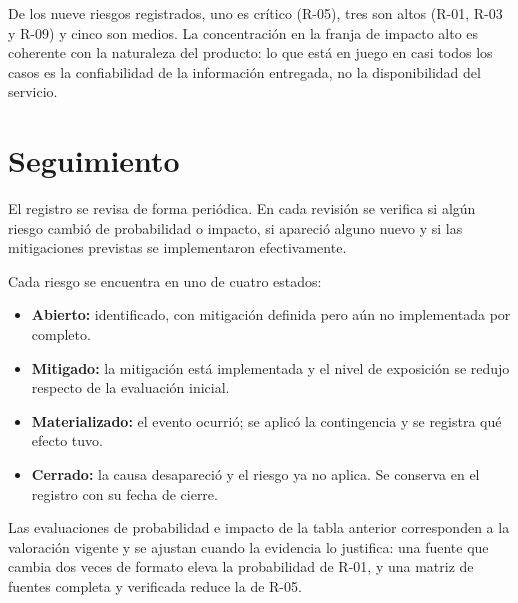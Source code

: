 \documentclass[11pt,a4paper]{article}
\begin{document}
\bigskip

De los nueve riesgos registrados, uno es cr\'itico (R-05), tres son altos (R-01,
R-03 y R-09) y cinco son medios. La concentraci\'on en la franja de impacto alto
es coherente con la naturaleza del producto: lo que est\'a en juego en casi
todos los casos es la confiabilidad de la informaci\'on entregada, no la
disponibilidad del servicio.

\section{Seguimiento}
\label{sec:seguimiento}

El registro se revisa de forma peri\'odica. En cada revisi\'on se verifica si
alg\'un riesgo cambi\'o de probabilidad o impacto, si apareci\'o alguno nuevo y
si las mitigaciones previstas se implementaron efectivamente.

Cada riesgo se encuentra en uno de cuatro estados:

\begin{itemize}
  \item \textbf{Abierto:} identificado, con mitigaci\'on definida pero a\'un no
        implementada por completo.
  \item \textbf{Mitigado:} la mitigaci\'on est\'a implementada y el nivel de
        exposici\'on se redujo respecto de la evaluaci\'on inicial.
  \item \textbf{Materializado:} el evento ocurri\'o; se aplic\'o la
        contingencia y se registra qu\'e efecto tuvo.
  \item \textbf{Cerrado:} la causa desapareci\'o y el riesgo ya no aplica. Se
        conserva en el registro con su fecha de cierre.
\end{itemize}

Las evaluaciones de probabilidad e impacto de la tabla anterior corresponden a
la valoraci\'on vigente y se ajustan cuando la evidencia lo justifica: una
fuente que cambia dos veces de formato eleva la probabilidad de R-01, y una
matriz de fuentes completa y verificada reduce la de R-05.
\end{document}
